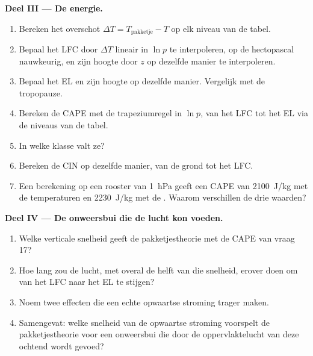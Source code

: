 \begin{problem}
\medskip\noindent\textbf{Deel III --- De energie.}
\begin{enumerate}[resume]
  \item Bereken het overschot $\Delta T = T_{\text{pakketje}} - T$ op elk niveau van de tabel.
  \item Bepaal het LFC door $\Delta T$ lineair in $\ln p$ te interpoleren, op de hectopascal nauwkeurig,
        en zijn hoogte door $z$ op dezelfde manier te interpoleren.
  \item Bepaal het EL en zijn hoogte op dezelfde manier. Vergelijk met de tropopauze.
  \item Bereken de CAPE met de trapeziumregel in $\ln p$, van het LFC tot het EL via de
        niveaus van de tabel.
  \item In welke klasse valt ze?
  \item Bereken de CIN op dezelfde manier, van de grond tot het LFC.
  \item Een berekening op een rooster van \qty{1}{hPa} geeft een CAPE van \qty{2100}{J/kg} met de
        temperaturen en \qty{2230}{J/kg} met de . Waarom verschillen de drie
        waarden?
\end{enumerate}

\medskip\noindent\textbf{Deel IV --- De onweersbui die de lucht kon voeden.}
\begin{enumerate}[resume]
  \item Welke verticale snelheid geeft de pakketjestheorie met de CAPE van vraag 17?
  \item Hoe lang zou de lucht, met overal de helft van die snelheid, erover doen om van het LFC naar het EL te stijgen?
  \item Noem twee effecten die een echte opwaartse stroming trager maken.
  \item Samengevat: welke snelheid van de opwaartse stroming voorspelt de pakketjestheorie voor een onweersbui die door de
        oppervlaktelucht van deze ochtend wordt gevoed?
\end{enumerate}
\end{problem}
